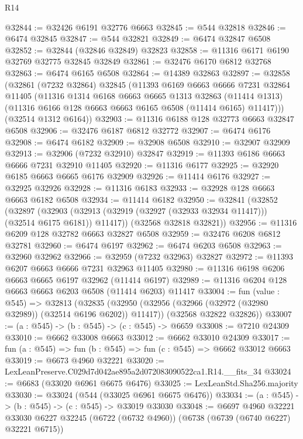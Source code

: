 \begin{lexlean}{R14}
\begin{coremodule}
@32844 := @32426 @6191 @32776 @6663
@32845 := @544 @32818
@32846 := @6474 @32845
@32847 := @544 @32821
@32849 := @6474 @32847 @6508
@32852 := @32844 (@32846 @32849) @32823
@32858 := @11316 @6171 @6190 @32769 @32775 @32845 @32849
@32861 := @32476 @6170 @6812 @32768
@32863 := @6474 @6165 @6508
@32864 := @14389 @32863
@32897 := @32858
    (@32861
      (@7232 @32864)
      @32845
      (@11393
        @6169
        @6663
        @6666
        @7231
        @32864
        @11405
        (@11316
          @1314
          @6168
          @6663
          @6665
          @1313
          @32863
          (@11414 @1313)
          (@11316 @6166 @128 @6663 @6663 @6165 @6508 (@11414 @6165) @11417)))
      (@32514 @1312 @6164))
@32903 := @11316 @6188 @128 @32773 @6663 @32847 @6508
@32906 := @32476 @6187 @6812 @32772
@32907 := @6474 @6176
@32908 := @6474 @6182
@32909 := @32908 @6508
@32910 := @32907 @32909
@32913 := @32906 (@7232 @32910) @32847
@32919 := @11393 @6186 @6663 @6666 @7231 @32910 @11405
@32920 := @11316 @6177
@32925 := @32920 @6185 @6663 @6665 @6176 @32909
@32926 := @11414 @6176
@32927 := @32925 @32926
@32928 := @11316 @6183
@32933 := @32928 @128 @6663 @6663 @6182 @6508
@32934 := @11414 @6182
@32950 := @32841
    (@32852
      (@32897
        (@32903 (@32913 (@32919 (@32927 (@32933 @32934 @11417))) (@32514 @6175 @6181)) @11417))
      (@32568 @32818 @32821))
@32956 := @11316 @6209 @128 @32782 @6663 @32827 @6508
@32959 := @32476 @6208 @6812 @32781
@32960 := @6474 @6197
@32962 := @6474 @6203 @6508
@32963 := @32960 @32962
@32966 := @32959 (@7232 @32963) @32827
@32972 := @11393 @6207 @6663 @6666 @7231 @32963 @11405
@32980 := @11316 @6198 @6206 @6663 @6665 @6197 @32962 (@11414 @6197)
@32989 := @11316 @6204 @128 @6663 @6663 @6203 @6508 (@11414 @6203) @11417
@33004 := fun (value : @545) =>
  @32813
    (@32835
      (@32950 (@32956 (@32966 (@32972 (@32980 @32989)) (@32514 @6196 @6202)) @11417))
      (@32568 @32822 @32826))
@33007 := (a : @545) -> (b : @545) -> (c : @545) -> @6659
@33008 := @7210 @24309
@33010 := @6662 @33008 @6663
@33012 := @6662 @33010 @24309
@33017 := fun (a : @545) => fun (b : @545) => fun (c : @545) => @6662 @33012 @6663
@33019 := @6673 @4960 @32221
@33020 := LexLeanPreserve.C029d7d042ae895a2d072083090522ca1.R14.__fits_34
@33024 := @6683 (@33020 @6961 @6675 @6476)
@33025 := LexLeanStd.Sha256.majority
@33030 := @33024 (@544 (@33025 @6961 @6675 @6476))
@33034 := (a : @545) -> (b : @545) -> (c : @545) -> @33019 @33030
@33048 := @6697
    @4960
    @32221
    @33030
    @6227
    @32245
    (@6722 (@6732 @4960))
    (@6738 (@6739 (@6740 @6227) @32221 @6715))

\end{coremodule}
\end{lexlean}
